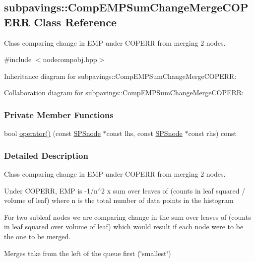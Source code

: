 \hypertarget{classsubpavings_1_1CompEMPSumChangeMergeCOPERR}{\subsection{subpavings\-:\-:\-Comp\-E\-M\-P\-Sum\-Change\-Merge\-C\-O\-P\-E\-R\-R \-Class \-Reference}
\label{classsubpavings_1_1CompEMPSumChangeMergeCOPERR}
}


\-Class comparing change in \-E\-M\-P under \-C\-O\-P\-E\-R\-R from merging 2 nodes.  




{\ttfamily \#include $<$nodecompobj.\-hpp$>$}



\-Inheritance diagram for subpavings\-:\-:\-Comp\-E\-M\-P\-Sum\-Change\-Merge\-C\-O\-P\-E\-R\-R\-:


\-Collaboration diagram for subpavings\-:\-:\-Comp\-E\-M\-P\-Sum\-Change\-Merge\-C\-O\-P\-E\-R\-R\-:
\subsubsection*{\-Private \-Member \-Functions}
\begin{DoxyCompactItemize}
\item 
bool \hyperlink{classsubpavings_1_1CompEMPSumChangeMergeCOPERR_a74068f89bb79484997ef9819ebdb0e5b}{operator()} (const \hyperlink{classsubpavings_1_1SPSnode}{\-S\-P\-Snode} $\ast$const lhs, const \hyperlink{classsubpavings_1_1SPSnode}{\-S\-P\-Snode} $\ast$const rhs) const 
\end{DoxyCompactItemize}


\subsubsection{\-Detailed \-Description}
\-Class comparing change in \-E\-M\-P under \-C\-O\-P\-E\-R\-R from merging 2 nodes. 

\-Under \-C\-O\-P\-E\-R\-R, \-E\-M\-P is -\/1/n$^\wedge$2 x sum over leaves of (counts in leaf squared / volume of leaf) where n is the total number of data points in the histogram

\-For two subleaf nodes we are comparing change in the sum over leaves of (counts in leaf squared over volume of leaf) which would result if each node were to be the one to be merged.

\-Merges take from the left of the queue first (\char`\"{}smallest\char`\"{})

